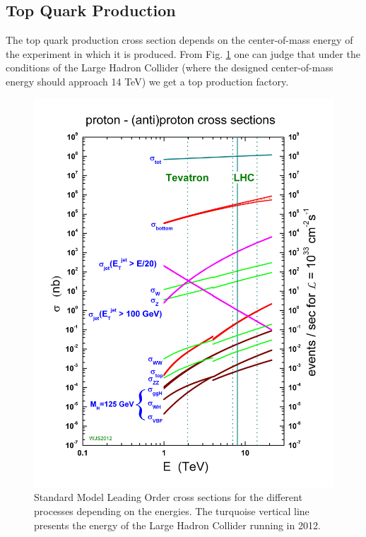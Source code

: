 \subsection{Top Quark Production}

The top quark production cross section depends on the center-of-mass energy of the experiment in which it is produced. From Fig. \ref{fig:SM_XSec_Prod}
one can judge that under the conditions of the Large Hadron Collider (where the designed center-of-mass energy should approach 14 TeV) we get 
a top production factory.

\begin{figure}[h]
  \centering
  \includegraphics[width=1.0\textwidth]{01_Theory_SM/plots/crosssections2013.png}
  \caption{Standard Model Leading Order cross sections for the different processes depending on the energies. The turquoise vertical line presents the energy
  of the Large Hadron Collider running in 2012.}
  \label{fig:SM_XSec_Prod}
\end{figure}

